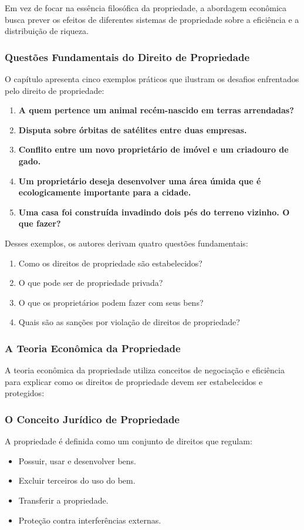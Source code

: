 \documentclass[a4paper,12pt]{article}[abntex2]
\begin{document}
Em vez de focar na essência filosófica da propriedade, a abordagem econômica busca prever os efeitos de diferentes sistemas de propriedade sobre a eficiência e a distribuição de riqueza.

\subsubsection{Questões Fundamentais do Direito de Propriedade}

O capítulo apresenta cinco exemplos práticos que ilustram os desafios enfrentados pelo direito de propriedade:

\begin{enumerate}
    \item \textbf{A quem pertence um animal recém-nascido em terras arrendadas?}
    \item \textbf{Disputa sobre órbitas de satélites entre duas empresas.}
    \item \textbf{Conflito entre um novo proprietário de imóvel e um criadouro de gado.}
    \item \textbf{Um proprietário deseja desenvolver uma área úmida que é ecologicamente importante para a cidade.}
    \item \textbf{Uma casa foi construída invadindo dois pés do terreno vizinho. O que fazer?}
\end{enumerate}

Desses exemplos, os autores derivam quatro questões fundamentais:
\begin{enumerate}
    \item Como os direitos de propriedade são estabelecidos?
    \item O que pode ser de propriedade privada?
    \item O que os proprietários podem fazer com seus bens?
    \item Quais são as sanções por violação de direitos de propriedade?
\end{enumerate}

\subsubsection{A Teoria Econômica da Propriedade}

A teoria econômica da propriedade utiliza conceitos de negociação e eficiência para explicar como os direitos de propriedade devem ser estabelecidos e protegidos:

\subsubsection{O Conceito Jurídico de Propriedade}
A propriedade é definida como um conjunto de direitos que regulam:
\begin{itemize}
    \item Possuir, usar e desenvolver bens.
    \item Excluir terceiros do uso do bem.
    \item Transferir a propriedade.
    \item Proteção contra interferências externas.
\end{itemize}
\end{document}
